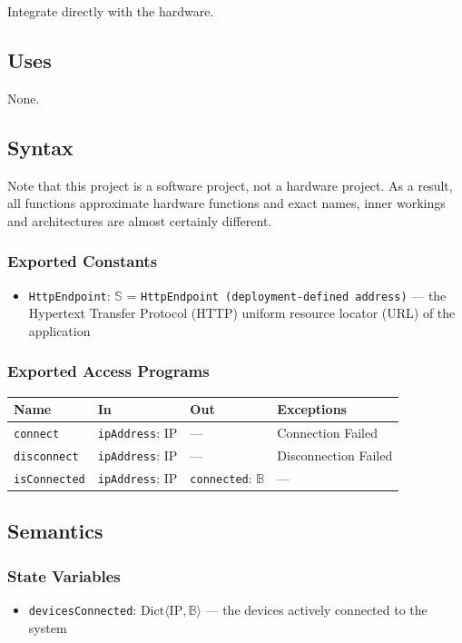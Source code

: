 \documentclass[12pt, titlepage]{article}
\begin{document}
Integrate directly with the hardware.

\subsection{Uses}
None.

\subsection{Syntax}
Note that this project is a software project, not a hardware project. As a result,
all functions approximate hardware functions and exact names, inner workings and 
architectures are almost certainly different.

\subsubsection{Exported Constants}
\begin{itemize}
  \item \texttt{HttpEndpoint}: $\mathbb{S}$ = \texttt{HttpEndpoint (deployment-defined address)} --- the Hypertext Transfer Protocol (HTTP) uniform resource locator (URL) of the application
\end{itemize}

\subsubsection{Exported Access Programs}
\begin{tabularx}{\textwidth}{p{2.7cm} p{4.2cm} p{2.8cm} X}
\toprule
\textbf{Name} & \textbf{In} & \textbf{Out} & \textbf{Exceptions} \\
\midrule
\texttt{connect} & \texttt{ipAddress}: IP & --- & Connection Failed \\
\texttt{disconnect} & \texttt{ipAddress}: IP & --- & Disconnection Failed \\
\texttt{isConnected} & \texttt{ipAddress}: IP & \texttt{connected}: $\mathbb{B}$ & --- \\
\bottomrule
\end{tabularx}

\subsection{Semantics}

\subsubsection{State Variables}
\begin{itemize}
  \item \texttt{devicesConnected}: $\text{Dict}\langle \text{IP}, \mathbb{B} \rangle$ --- the devices actively connected to the system
\end{itemize}
\end{document}

